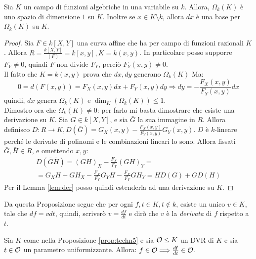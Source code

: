         \begin{proposizione} \label{prop:techn5}
            Sia $K$ un campo di funzioni algebriche in una variabile su $k$. 
            Allora, $\Omega_k(K)$ è uno spazio di dimensione $1$ su $K$. 
            Inoltre se $x \in K \setminus k$, allora $dx$ è una base per 
            $\Omega_k(K)$ su $K$.
        \end{proposizione}
        \begin{proof}
            Sia $F \in k[X,Y]$ una curva affine che ha per campo di funzioni 
            razionali $K$. Allora $R = \frac{k[X,Y]}{(F)} = k[x,y], K = 
            k(x,y)$. In particolare posso supporre $F_Y \neq 0$, quindi $F$ 
            non divide $F_Y$, perciò $F_Y(x,y) \neq 0$.\\
            Il fatto che $K = k(x,y)$ prova che $dx,dy$ generano $\Omega_k(K)$ 
            Ma: $$0 = d(F(x,y)) = F_X(x,y)dx + F_Y(x,y)dy \Longrightarrow dy = -\frac{F_X(x,y)}{F_Y(x,y)} dx$$
            quindi, $dx$ genera $\Omega_k(K)$ e $\dim_K(\Omega_k(K)) \leq 1$. \\
            Dimostro ora che $\Omega_k(K) \neq 0$: per farlo mi basta dimostrare che 
            esiste una derivazione su $K$. Sia $G \in k[X,Y]$, e sia $\bar{G}$ la sua immagine in 
            $R$. Allora definisco $D : R \to K, D(\bar{G}) = G_X(x,y) - \frac{F_X(x,y)}{F_Y(x,y)}G_Y(x,y)$.
            $D$ è $k$-lineare perché le derivate di polinomi e le combinazioni lineari lo sono. Allora fissati $\bar{G},\bar{H} \in R$, e omettendo $x,y$: \begin{multline*}
                D(\bar{G}\bar{H}) = (GH)_X - \frac{F_X}{F_Y}(GH)_Y = \\ = G_XH + GH_X - \frac{F_X}{F_Y}G_YH - \frac{F_X}{F_Y}GH_Y = HD(G) + GD(H)
            \end{multline*}
            Per il Lemma \ref{lem:der} posso quindi estenderla ad una derivazione su $K$.
        \end{proof}
        Da questa Proposizione segue che per ogni $f,t \in K, t \notin k$, esiste un unico $v \in K$, tale che $df = vdt$, 
        quindi, scriverò $v = \frac{df}{dt}$ e dirò che $v$ è la \emph{derivata} di $f$ rispetto a $t$. 
        \begin{proposizione}\label{prop:techn6}
            Sia $K$ come nella Proposizione \ref{prop:techn5} e sia $\mathcal{O} \leq K$ un DVR di $K$ e sia $t \in \mathcal{O}$ un parametro 
            uniformizzante. Allora: $f \in \mathcal{O} \Longrightarrow \frac{df}{dt} \in \mathcal{O}$.
        \end{proposizione}
